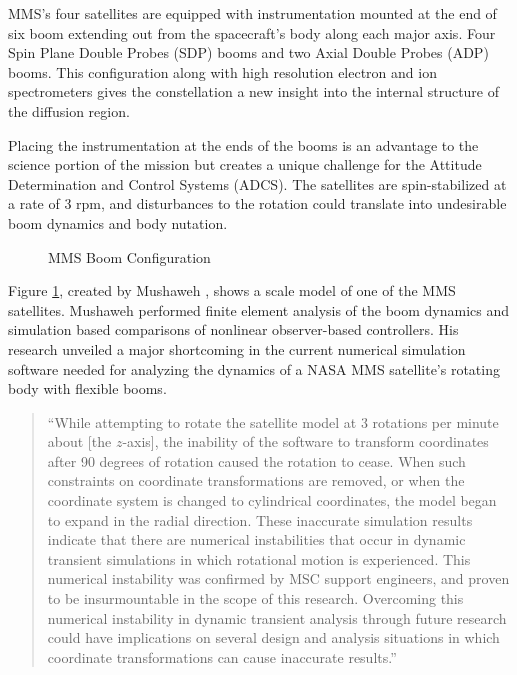 MMS's four satellites are equipped with instrumentation mounted at the end of six boom extending out from the spacecraft's body along each major axis.  Four Spin Plane Double Probes (SDP) booms and two Axial Double Probes (ADP) booms.  This configuration along with high resolution electron and ion spectrometers gives the constellation a new insight into the internal structure of the diffusion region.

Placing the instrumentation at the ends of the booms is an advantage to the science portion of the mission but creates a unique challenge for the Attitude Determination and Control Systems (ADCS).  The satellites are spin-stabilized at a rate of 3 rpm, and disturbances to the rotation could translate into undesirable boom dynamics and body nutation.

\begin{figure}[H]
  \centerline{}
  \caption{MMS Boom Configuration \cite{mushawehthesis}}
  \label{fig:booms}
\end{figure}

Figure \ref{fig:booms}, created by Mushaweh \cite{mushawehthesis}, shows a scale model of one of the MMS satellites.  Mushaweh performed finite element analysis of the boom dynamics and simulation based comparisons of nonlinear observer-based controllers.  His research unveiled a major shortcoming in the current numerical simulation software needed for analyzing the dynamics of a NASA MMS satellite's rotating body with flexible booms.

\begin{quote}{``While attempting to rotate the satellite model at 3 rotations per minute about [the $z$-axis], the inability of the software to transform coordinates after 90 degrees of rotation caused the rotation to cease. When such constraints on coordinate transformations are removed, or when the coordinate system is changed to cylindrical coordinates, the model began to expand in the radial direction. These inaccurate simulation results indicate that there are numerical instabilities that occur in dynamic transient simulations in which rotational motion is experienced. This numerical instability was confirmed by MSC support engineers, and proven to be insurmountable in the scope of this research. Overcoming this numerical instability in dynamic transient analysis through future research could have implications on several design and analysis situations in which coordinate transformations can cause inaccurate results.''~\cite{mushawehthesis}}\end{quote}


